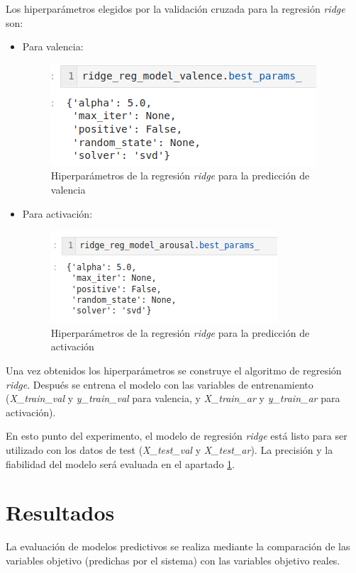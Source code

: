 \documentclass[12pt,a4paper,Spanish]{article}
\begin{document}
Los hiperparámetros elegidos por la validación cruzada para la regresión \textit{ridge} son:
\begin{itemize}
	\item Para valencia:
	\begin{figure}[H]
		\centering
		\includegraphics[width=0.5\linewidth]{figs/final_params_ridge_valence}
		\caption{Hiperparámetros de la regresión \textit{ridge} para la predicción de valencia}
		\label{fig:finalparamsridgevalence}
	\end{figure}
	\item Para activación:
	\begin{figure}[H]
		\centering
		\includegraphics[width=0.5\linewidth]{figs/final_params_ridge_arousal}
		\caption{Hiperparámetros de la regresión \textit{ridge} para la predicción de activación}
		\label{fig:finalparamsridgearousal}
	\end{figure}
	
\end{itemize}

Una vez obtenidos los hiperparámetros se construye el algoritmo de regresión \textit{ridge}. Después se entrena el modelo con las variables de entrenamiento (\textit{X\_train\_val} y \textit{y\_train\_val} para valencia, y \textit{X\_train\_ar} y \textit{y\_train\_ar} para activación).
\newline

En esto punto del experimento, el modelo de regresión \textit{ridge} está listo para ser utilizado con los datos de test (\textit{X\_test\_val} y \textit{X\_test\_ar}). La precisión y la fiabilidad del modelo será evaluada en el apartado \ref{resultados}.









\newpage
\section{Resultados}\label{resultados}
La evaluación de modelos predictivos se realiza mediante la comparación de las variables objetivo (predichas por el sistema) con las variables objetivo reales.
\newline
\end{document}

